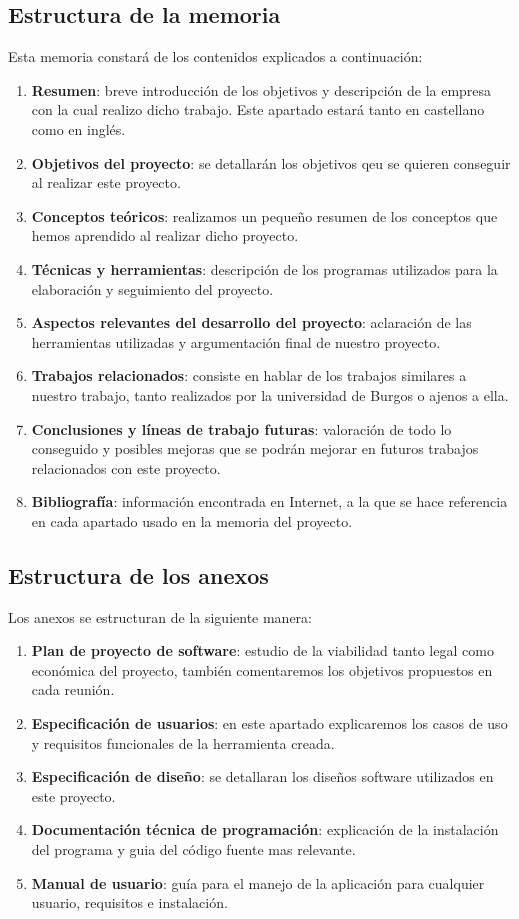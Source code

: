 \subsection{Estructura de la memoria}

Esta memoria constará de los contenidos explicados a continuación:

\begin{enumerate}[1)]
\item \textbf{Resumen}: breve introducción de los objetivos y descripción de la empresa con la cual realizo dicho trabajo. Este apartado estará tanto en castellano como en inglés. 
\item \textbf{Objetivos del proyecto}: se detallarán los objetivos qeu se quieren conseguir al realizar este proyecto.
\item \textbf{Conceptos teóricos}: realizamos un pequeño resumen de los conceptos que hemos aprendido al realizar dicho proyecto.
\item \textbf{Técnicas y herramientas}: descripción de los programas utilizados para la elaboración y seguimiento del proyecto.
\item \textbf{Aspectos relevantes del desarrollo del proyecto}: aclaración de las herramientas utilizadas y argumentación final de nuestro proyecto.
\item \textbf{Trabajos relacionados}: consiste en hablar de los trabajos similares a nuestro trabajo, tanto realizados por la universidad de Burgos o ajenos a ella.
\item \textbf{Conclusiones y líneas de trabajo futuras}: valoración de todo lo conseguido y posibles mejoras que se podrán mejorar en futuros trabajos relacionados con este proyecto.
\item \textbf{Bibliografía}: información encontrada en Internet, a la que se hace referencia en cada apartado usado en la memoria del proyecto. 
\end{enumerate}

\subsection{Estructura de los anexos}

Los anexos se estructuran de la siguiente manera:

\begin{enumerate}[1)]
	\item \textbf{Plan de proyecto de software}: estudio de la viabilidad tanto legal como económica del proyecto, también comentaremos los objetivos propuestos en cada reunión.
	\item \textbf{Especificación de usuarios}: en este apartado explicaremos los
casos de uso y requisitos funcionales de la herramienta creada.
	\item \textbf{Especificación de diseño}: se detallaran los diseños software utilizados en este proyecto.
	\item \textbf{Documentación técnica de programación}: explicación de la instalación del programa y guia del código fuente mas relevante.
	\item \textbf{Manual de usuario}: guía para el manejo de la aplicación para cualquier usuario, requisitos e instalación.
\end{enumerate}

